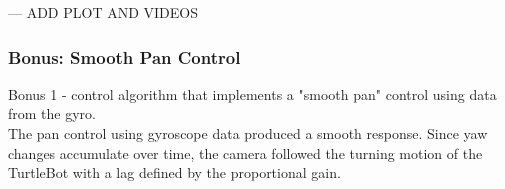 --- ADD PLOT AND VIDEOS

\subsubsection{Bonus: Smooth Pan Control}

Bonus 1 - control algorithm that implements a "smooth pan" control using data from the gyro.  \\

The pan control using gyroscope data produced a smooth response. Since yaw changes accumulate over time, the camera followed the turning motion of the TurtleBot with a lag defined by the proportional gain.








